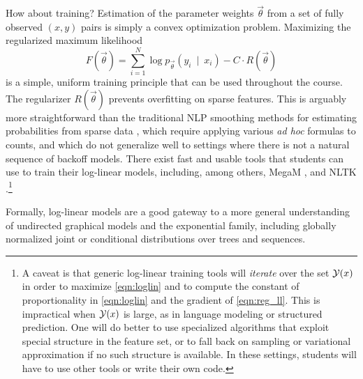 \documentclass[11pt,letterpaper]{article}
\DeclareMathOperator*{\argmax}{arg\,max}
\newcommand{\Note}[1]{}
\renewcommand{\Note}[1]{\hl{[#1]}}
\newcommand{\NoteSigned}[3]{{\sethlcolor{#2}\Note{#1: #3}}}
\newcommand{\NoteFF}[1]{\NoteSigned{FF}{LightBlue}{#1}}
\newcommand{\NoteJE}[1]{\NoteSigned{JE}{LightGreen}{#1}}
\begin{document}
How about training?  Estimation of the parameter weights
$\vec{\theta}$ from a set of fully observed $(x,y)$ pairs is simply a
convex optimization problem.  Maximizing the regularized maximum
likelihood
\begin{equation}\label{eqn:reg_ll}
  F\left(\vec{\theta}\right) = \sum_{i=1}^N \log{p_{\vec{\theta}}\left(y_i\ \mid\ x_i\right)} - C \cdot R\left(\vec{\theta}\right)
\end{equation}
is a simple, uniform training principle that can be used throughout
the course.  The regularizer $R(\vec{\theta})$
prevents overfitting on sparse features.
This is arguably more straightforward than the traditional NLP
smoothing methods for estimating probabilities from sparse data
\cite{chen-goodman-1996}, which require applying various {\em ad hoc}
formulas to counts, and which do not generalize well to settings where
there is not a natural sequence of backoff models.  There exist 
fast and usable tools that students can use to train their log-linear
models, including, among others, MegaM \cite{daume04cg-bfgs}, 
and NLTK \cite{bird2009natural}.\footnote{\label{fn:bigY}A caveat is that generic
  log-linear training tools will {\em iterate} over the set ${\cal
    Y}(x)$ in order to maximize
  \eqref{eqn:loglin} and to compute the constant of proportionality
  in \eqref{eqn:loglin} and the gradient of
  \eqref{eqn:reg_ll}.  This is impractical when ${\cal Y}(x)$ is large, as in
  language modeling or structured prediction.  One will do better to
  use specialized algorithms that exploit special structure in the
  feature set, or to fall back on sampling or variational
  approximation if no such structure is available.  In these settings,
  students will have to use other tools or write their own code.}

Formally, log-linear models are a good gateway to a more general
understanding of undirected graphical models and the exponential
family, including globally normalized joint or conditional
distributions over trees and sequences.
\end{document}
